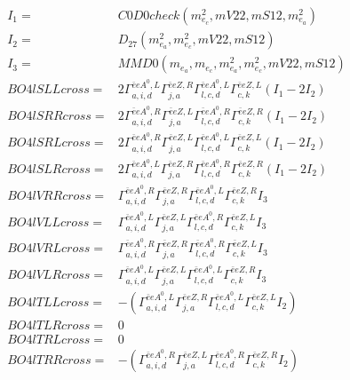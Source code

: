 \documentclass[A4,landscape]{article}
\begin{document}
\begin{align} 
I_1 = & C0D0check(m^2_{e_{{c}}}, mV22, mS12, m^2_{e_{{a}}}) \\ 
I_2 = & D_{27}(m^2_{e_{{a}}}, m^2_{e_{{c}}}, mV22, mS12) \\ 
I_3 = & MMD0(m_{e_{{a}}}, m_{e_{{c}}}, m^2_{e_{{a}}}, m^2_{e_{{c}}}, mV22, mS12) \\ 
  BO4lSLLcross= & 2  \Gamma^{\bar{e}e A^0 ,L}_{a, i, d} \Gamma^{\bar{e}e Z ,R}_{j, a} \Gamma^{\bar{e}e A^0 ,L}_{l, c, d} \Gamma^{\bar{e}e Z ,L}_{c, k} (I_1 - 2 I_2) \\ 
  BO4lSRRcross= & 2  \Gamma^{\bar{e}e A^0 ,R}_{a, i, d} \Gamma^{\bar{e}e Z ,L}_{j, a} \Gamma^{\bar{e}e A^0 ,R}_{l, c, d} \Gamma^{\bar{e}e Z ,R}_{c, k} (I_1 - 2 I_2) \\ 
  BO4lSRLcross= & 2  \Gamma^{\bar{e}e A^0 ,R}_{a, i, d} \Gamma^{\bar{e}e Z ,L}_{j, a} \Gamma^{\bar{e}e A^0 ,L}_{l, c, d} \Gamma^{\bar{e}e Z ,L}_{c, k} (I_1 - 2 I_2) \\ 
  BO4lSLRcross= & 2  \Gamma^{\bar{e}e A^0 ,L}_{a, i, d} \Gamma^{\bar{e}e Z ,R}_{j, a} \Gamma^{\bar{e}e A^0 ,R}_{l, c, d} \Gamma^{\bar{e}e Z ,R}_{c, k} (I_1 - 2 I_2) \\ 
  BO4lVRRcross= &  \Gamma^{\bar{e}e A^0 ,R}_{a, i, d} \Gamma^{\bar{e}e Z ,R}_{j, a} \Gamma^{\bar{e}e A^0 ,L}_{l, c, d} \Gamma^{\bar{e}e Z ,R}_{c, k} I_3 \\ 
  BO4lVLLcross= &  \Gamma^{\bar{e}e A^0 ,L}_{a, i, d} \Gamma^{\bar{e}e Z ,L}_{j, a} \Gamma^{\bar{e}e A^0 ,R}_{l, c, d} \Gamma^{\bar{e}e Z ,L}_{c, k} I_3 \\ 
  BO4lVRLcross= &  \Gamma^{\bar{e}e A^0 ,R}_{a, i, d} \Gamma^{\bar{e}e Z ,R}_{j, a} \Gamma^{\bar{e}e A^0 ,R}_{l, c, d} \Gamma^{\bar{e}e Z ,L}_{c, k} I_3 \\ 
  BO4lVLRcross= &  \Gamma^{\bar{e}e A^0 ,L}_{a, i, d} \Gamma^{\bar{e}e Z ,L}_{j, a} \Gamma^{\bar{e}e A^0 ,L}_{l, c, d} \Gamma^{\bar{e}e Z ,R}_{c, k} I_3 \\ 
  BO4lTLLcross= & -( \Gamma^{\bar{e}e A^0 ,L}_{a, i, d} \Gamma^{\bar{e}e Z ,R}_{j, a} \Gamma^{\bar{e}e A^0 ,L}_{l, c, d} \Gamma^{\bar{e}e Z ,L}_{c, k} I_2) \\ 
  BO4lTLRcross= & 0 \\ 
  BO4lTRLcross= & 0 \\ 
  BO4lTRRcross= & -( \Gamma^{\bar{e}e A^0 ,R}_{a, i, d} \Gamma^{\bar{e}e Z ,L}_{j, a} \Gamma^{\bar{e}e A^0 ,R}_{l, c, d} \Gamma^{\bar{e}e Z ,R}_{c, k} I_2) \\ 
\end{align} 
\end{document}
